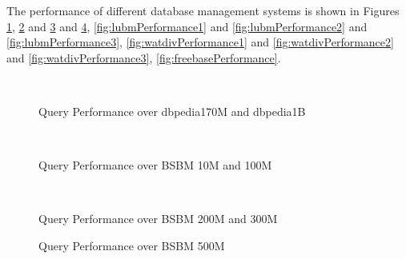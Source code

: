 \documentclass[titlepage, a4paper, 12pt] {article}
\begin{document}
The performance of different database management systems is shown in Figures \ref{fig:dbpediaPerformance}, \ref{fig:bsbmPerformance1} and \ref{fig:bsbmPerformance2} and \ref{fig:bsbmPerformance3}, \ref{fig:lubmPerformance1} and \ref{fig:lubmPerformance2} and \ref{fig:lubmPerformance3}, \ref{fig:watdivPerformance1} and \ref{fig:watdivPerformance2} and \ref{fig:watdivPerformance3}, \ref{fig:freebasePerformance}.

\begin{comment}
Notice that storage buffer size is set to 8G when testing lubm500M, while 4G for other cases.
The block size is set to 64K when testing lubm500M, while 4K in other cases.
The query results for lubm500M are all empty, so the time is very fast and we can not tell which system is better.
\end{comment}

\begin{figure}[t]%
	\subfigure[dbpedia170M]{%
		\resizebox{\columnwidth}{!}{
			
		}
		\label{fig:dbpedia170MPerformance}%
	}
	\\
	\subfigure[dbpedia1B]{%
		\resizebox{\columnwidth}{!}{
			
		}
		\label{fig:dbpedia1BPerformance}%
	}%
	\caption{Query Performance over dbpedia170M and dbpedia1B}%
	\label{fig:dbpediaPerformance}
\end{figure}

\begin{figure}[t]%
	\subfigure[bsbm10M]{%
		\resizebox{\columnwidth}{!}{
			
		}
		\label{fig:bsbm10MPerformance}%
	}
	\\
	\subfigure[bsbm100M]{%
		\resizebox{\columnwidth}{!}{
			
		}
		\label{fig:bsbm100MPerformance}%
	}%
	\caption{Query Performance over BSBM 10M and 100M}%
	\label{fig:bsbmPerformance1}
\end{figure}

\begin{figure}[t]%
	\subfigure[bsbm200M]{%
		\resizebox{\columnwidth}{!}{
			
		}
		\label{fig:bsbm200MPerformance}%
	}%
	\\
	\subfigure[bsbm300M]{%
		\resizebox{\columnwidth}{!}{
			
		}
		\label{fig:bsbm300MPerformance}%
	}%
	\caption{Query Performance over BSBM 200M and 300M}%
	\label{fig:bsbmPerformance2}
\end{figure}

\begin{figure}[t]%
	\subfigure[bsbm500M]{%
		\resizebox{\columnwidth}{!}{
			
		}
		\label{fig:bsbm500MPerformance}%
	}%
	\caption{Query Performance over BSBM 500M}%
	\label{fig:bsbmPerformance3}
\end{figure}
\end{document}
